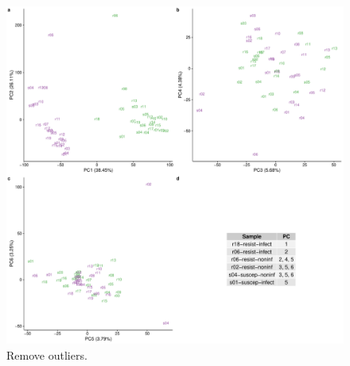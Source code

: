 \documentclass[fleqn,10pt]{wlscirep}
\begin{document}
\begin{figure}[ht]
\centering
\includegraphics[width=\linewidth]{../figure/outliers.pdf}
\caption{
Remove outliers.
}
\label{fig:outliers}
\end{figure}
\end{document}
